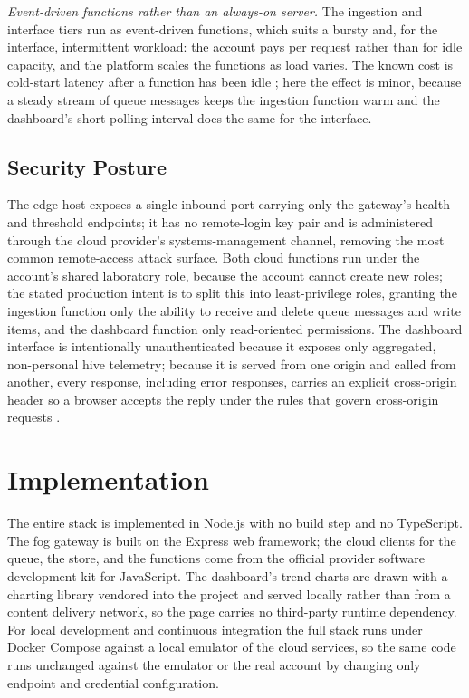\documentclass[conference]{IEEEtran}
\begin{document}
\textit{Event-driven functions rather than an always-on server.} The ingestion and interface tiers run as event-driven functions, which suits a bursty and, for the interface, intermittent workload: the account pays per request rather than for idle capacity, and the platform scales the functions as load varies. The known cost is cold-start latency after a function has been idle \cite{wang2018}; here the effect is minor, because a steady stream of queue messages keeps the ingestion function warm and the dashboard's short polling interval does the same for the interface.

\subsection{Security Posture}

The edge host exposes a single inbound port carrying only the gateway's health and threshold endpoints; it has no remote-login key pair and is administered through the cloud provider's systems-management channel, removing the most common remote-access attack surface. Both cloud functions run under the account's shared laboratory role, because the account cannot create new roles; the stated production intent is to split this into least-privilege roles, granting the ingestion function only the ability to receive and delete queue messages and write items, and the dashboard function only read-oriented permissions. The dashboard interface is intentionally unauthenticated because it exposes only aggregated, non-personal hive telemetry; because it is served from one origin and called from another, every response, including error responses, carries an explicit cross-origin header so a browser accepts the reply under the rules that govern cross-origin requests \cite{barth2011}.

\section{Implementation}

The entire stack is implemented in Node.js with no build step and no TypeScript. The fog gateway is built on the Express web framework; the cloud clients for the queue, the store, and the functions come from the official provider software development kit for JavaScript. The dashboard's trend charts are drawn with a charting library vendored into the project and served locally rather than from a content delivery network, so the page carries no third-party runtime dependency. For local development and continuous integration the full stack runs under Docker Compose against a local emulator of the cloud services, so the same code runs unchanged against the emulator or the real account by changing only endpoint and credential configuration.
\end{document}

